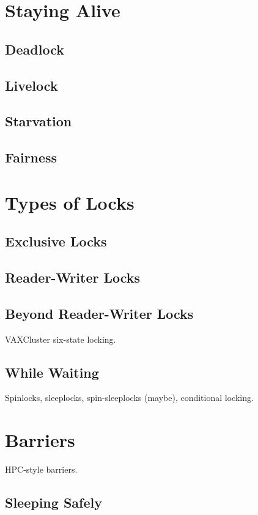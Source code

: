 

\section{Staying Alive}
\label{sec:locking:Staying Alive}

\subsection{Deadlock}
\label{sec:locking:Deadlock}

\subsection{Livelock}
\label{sec:locking:Livelock}

\subsection{Starvation}
\label{sec:locking:Starvation}

\subsection{Fairness}
\label{sec:locking:Fairness}

\section{Types of Locks}
\label{sec:locking:Types of Locks}

\subsection{Exclusive Locks}
\label{sec:locking:Exclusive Locks}

\subsection{Reader-Writer Locks}
\label{sec:locking:Reader-Writer Locks}

\subsection{Beyond Reader-Writer Locks}
\label{sec:locking:Beyond Reader-Writer Locks}

VAXCluster six-state locking.

\subsection{While Waiting}
\label{sec:locking:While Waiting}

Spinlocks, sleeplocks, spin-sleeplocks (maybe), conditional locking.

\section{Barriers}
\label{sec:locking:Barriers}

HPC-style barriers.

\subsection{Sleeping Safely}
\label{sec:locking:Sleeping Safely}


